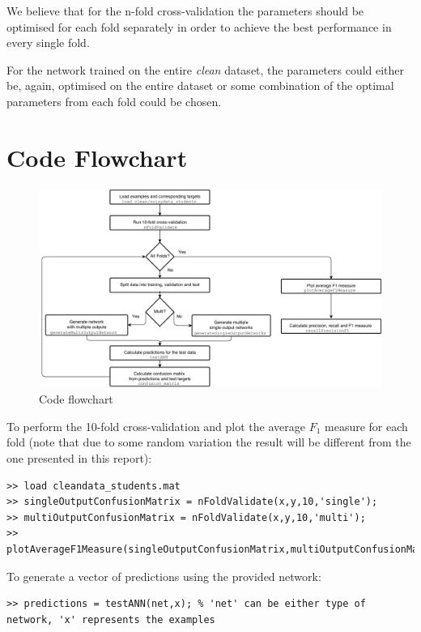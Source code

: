 \documentclass[a4paper]{article}
\begin{document}
We believe that for the n-fold cross-validation the parameters should be optimised for each fold separately in order to achieve the best performance in every single fold.\medskip

For the network trained on the entire \emph{clean} dataset, the parameters could either be, again, optimised on the entire dataset or some combination of the optimal parameters from each fold could be chosen.

\clearpage


\section{Code Flowchart}

\begin{figure}[H]
\center
\includegraphics[width=1\columnwidth]{flowchart}
\caption{Code flowchart}
\label{flowchart}
\end{figure}

To perform the 10-fold cross-validation and plot the average $F_1$ measure for each fold (note that due to some random variation the result will be different from the one presented in this report):
\begin{lstlisting}
>> load cleandata_students.mat
>> singleOutputConfusionMatrix = nFoldValidate(x,y,10,'single');
>> multiOutputConfusionMatrix = nFoldValidate(x,y,10,'multi');
>> plotAverageF1Measure(singleOutputConfusionMatrix,multiOutputConfusionMatrix);
\end{lstlisting}

To generate a vector of predictions using the provided network:
\begin{lstlisting}
>> predictions = testANN(net,x); % 'net' can be either type of network, 'x' represents the examples
\end{lstlisting}

\clearpage

\end{document}
